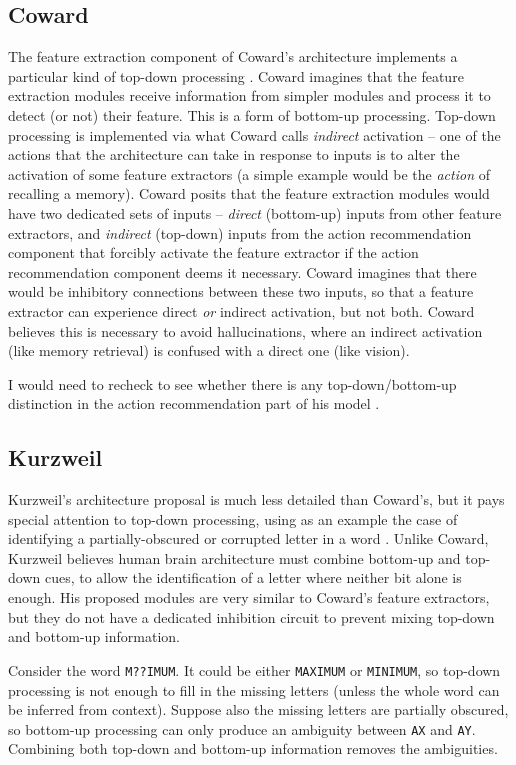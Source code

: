 \documentclass[10pt,a4paper]{article}
\begin{document}
\subsection{Coward}
The feature extraction component of Coward's architecture implements a particular kind of top-down processing \cite[p.~??]{coward}\cite{citationneeded}. Coward imagines that the feature extraction modules receive information from simpler modules and process it to detect (or not) their feature. This is a form of bottom-up processing. Top-down processing is implemented via what Coward calls \emph{indirect} activation -- one of the actions that the architecture can take in response to inputs is to alter the activation of some feature extractors (a simple example would be the \emph{action} of recalling a memory). Coward posits that the feature extraction modules would have two dedicated sets of inputs -- \emph{direct} (bottom-up) inputs from other feature extractors, and \emph{indirect} (top-down) inputs from the action recommendation component that forcibly activate the feature extractor if the action recommendation component deems it necessary. Coward imagines that there would be inhibitory connections between these two inputs, so that a feature extractor can experience direct \emph{or} indirect activation, but not both. Coward believes this is necessary to avoid hallucinations, where an indirect activation (like memory retrieval) is confused with a direct one (like vision).

I would need to recheck to see whether there is any top-down/bottom-up distinction in the action recommendation part of his model \cite{researchneeded}.

\subsection{Kurzweil}
Kurzweil's architecture proposal \cite{kurzweil} is much less detailed than Coward's, but it pays special attention to top-down processing, using as an example the case of identifying a partially-obscured or corrupted letter in a word \cite[p.~??]{kurzweil}\cite{citationneeded}. Unlike Coward, Kurzweil believes human brain architecture must combine bottom-up and top-down cues, to allow the identification of a letter where neither bit alone is enough. His proposed modules are very similar to Coward's feature extractors, but they do not have a dedicated inhibition circuit to prevent mixing top-down and bottom-up information.

Consider the word \texttt{M??IMUM}. It could be either \texttt{MAXIMUM} or \texttt{MINIMUM}, so top-down processing is not enough to fill in the missing letters (unless the whole word can be inferred from context). Suppose also the missing letters are partially obscured, so bottom-up processing can only produce an ambiguity between \texttt{AX} and \texttt{AY}. Combining both top-down and bottom-up information removes the ambiguities.
\end{document}
